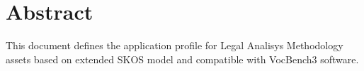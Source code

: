 \section*{Abstract}
This document defines the application profile for Legal Analisys Methodology assets based on extended SKOS model and compatible with VocBench3 software. 